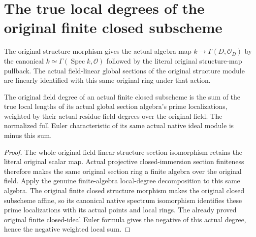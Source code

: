 \section{The true local degrees of the original finite closed subscheme}

\begin{definition}
\label{def:fc-finite-closed-structure-sections}
\leanok
{}
The original structure morphism gives the actual algebra map
$k\to\Gamma(D,\mathcal O_D)$ by the canonical $k\simeq\Gamma(\operatorname{Spec}k,\mathcal O)$
followed by the literal original structure-map pullback. The actual
field-linear global sections of the original structure module are
linearly identified with this same original ring under that action.
\end{definition}

\begin{theorem}
\label{thm:fc-finite-closed-ideal-local-degrees}
\leanok
{}
The original field degree of an actual finite closed subscheme is the
sum of the true local lengths of its actual global section algebra's
prime localizations, weighted by their actual residue-field degrees
over the original field. The normalized full Euler characteristic of
its same actual native ideal module is minus this sum.
\end{theorem}
\begin{proof}
The whole original field-linear structure-section isomorphism retains
the literal original scalar map. Actual projective closed-immersion
section finiteness therefore makes the same original section ring a
finite algebra over the original field. Apply the genuine finite-algebra
local-degree decomposition to this same algebra. The original finite
closed structure morphism makes the original closed subscheme affine,
so its canonical native spectrum isomorphism identifies these prime
localizations with its actual points and local rings. The already
proved original finite closed-ideal Euler formula gives the negative
of this actual degree, hence the negative weighted local sum.
\end{proof}

